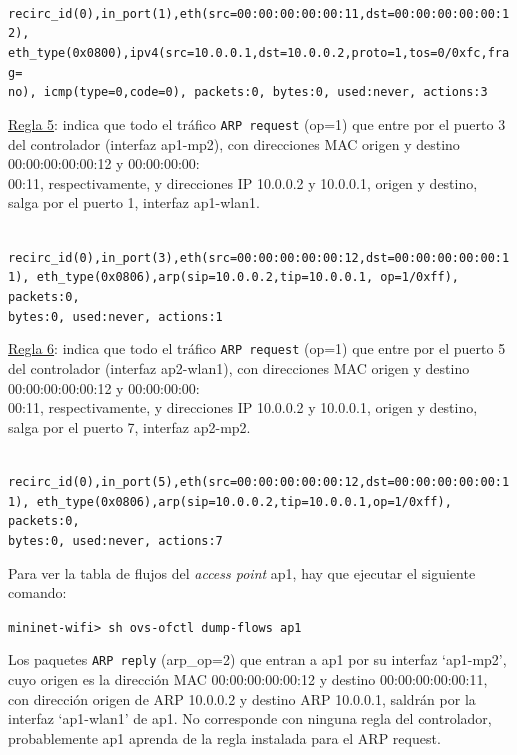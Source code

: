 \documentclass[a4paper,12pt,twoside,spanish]{book}
\begin{document}
\noindent\texttt{
	recirc\_id(0),in\_port(1),eth(src=00:00:00:00:00:11,dst=00:00:00:00:00:12),
	eth\_type(0x0800),ipv4(src=10.0.0.1,dst=10.0.0.2,proto=1,tos=0/0xfc,frag=\\no),
	icmp(type=0,code=0), packets:0, bytes:0, 	used:never, actions:3
}

\underline{Regla 5}: indica que todo el tráfico \texttt{ARP request} (op=1) que entre por el puerto 3 del controlador (interfaz ap1-mp2), con direcciones MAC origen y destino 00:00:00:00:00:12 y 00:00:00:00:\\
00:11, respectivamente, y direcciones IP 10.0.0.2 y 10.0.0.1, origen y destino, salga por el puerto 1, interfaz ap1-wlan1.\par

\noindent\texttt{
	recirc\_id(0),in\_port(3),eth(src=00:00:00:00:00:12,dst=00:00:00:00:00:11),
	eth\_type(0x0806),arp(sip=10.0.0.2,tip=10.0.0.1,
	op=1/0xff), packets:0,\\
	bytes:0, used:never, actions:1
}

\underline{Regla 6}: indica que todo el tráfico \texttt{ARP request} (op=1) que entre por el puerto 5 del controlador (interfaz ap2-wlan1), con direcciones MAC origen y destino 00:00:00:00:00:12 y 00:00:00:00:\\
00:11, respectivamente, y direcciones IP 10.0.0.2 y 10.0.0.1, origen y destino, salga por el puerto 7, interfaz ap2-mp2.\par 

\noindent\texttt{
	recirc\_id(0),in\_port(5),eth(src=00:00:00:00:00:12,dst=00:00:00:00:00:11),
	eth\_type(0x0806),arp(sip=10.0.0.2,tip=10.0.0.1,op=1/0xff), packets:0, \\
	bytes:0, used:never, actions:7
}

\hspace{1cm}

Para ver la tabla de flujos del \textit{access point} ap1, hay que ejecutar el siguiente comando:\par 

\begin{center}
	\texttt{mininet-wifi> sh ovs-ofctl dump-flows ap1}
\end{center}

Los paquetes \texttt{ARP reply} (arp\_op=2) que entran a ap1 por su interfaz ‘ap1-mp2’, cuyo origen es la dirección MAC 00:00:00:00:00:12 y destino 00:00:00:00:00:11, con dirección origen de ARP 10.0.0.2 y destino ARP 10.0.0.1, saldrán por la interfaz ‘ap1-wlan1’ de ap1. No corresponde con ninguna regla del controlador, probablemente ap1 aprenda de la regla instalada para el ARP request.\par 
\end{document}
